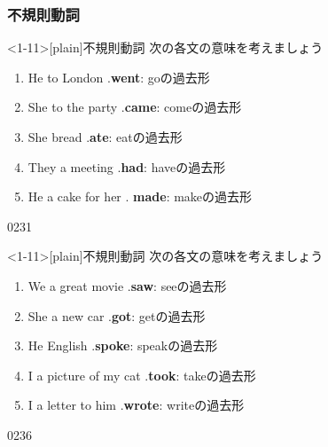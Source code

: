 \documentclass[aspectratio=169,xcolor={dvipsnames,table}]{beamer}
\newcommand{\myaudio}[1]{\href{#1}{\faVolumeUp}}
\begin{document}
\subsubsection{不規則動詞}
\begin{frame}<1-11>[plain]{不規則動詞}
 次の各文の意味を考えましょう

 \begin{enumerate}
  \item He  to London .\hfill{}{\small \textbf{went}: goの過去形}
  \item She  to the party .\hfill{}{\small \textbf{came}: comeの過去形}
  \item She  bread .\hfill{}{\small \textbf{ate}: eatの過去形}
  \item They  a meeting .\hfill{}{\small \textbf{had}: haveの過去形}
  \item He  a cake for her . \hfill{}{\small \textbf{made}: makeの過去形}
\end{enumerate}
\hfill{\tiny 0231}\,{\scriptsize \myaudio{./audio/025_past_do_11.mp3}}

\end{frame}
\begin{frame}<1-11>[plain]{不規則動詞}
 次の各文の意味を考えましょう

 \begin{enumerate}%
   \item We   a great movie  .\hfill{}{\small \textbf{saw}: seeの過去形}
  \item She  a new car  .\hfill{}{\small \textbf{got}: getの過去形}
  \item He  English  .\hfill{}{\small \textbf{spoke}: speakの過去形}
  \item I  a picture of my cat  .\hfill{}{\small \textbf{took}: takeの過去形}
  \item I  a letter to him  .\hfill{}{\small \textbf{wrote}: writeの過去形}
\end{enumerate}
\hfill{\tiny 0236}\,{\scriptsize \myaudio{./audio/025_past_do_12.mp3}}

\end{frame}
\end{document}
